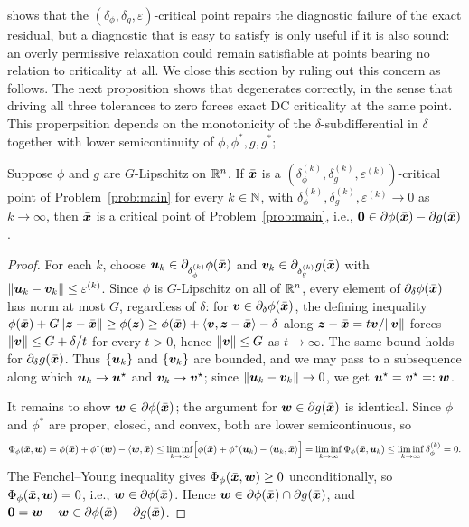  shows that the $(\delta_\phi,\delta_g,\varepsilon)$-critical point repairs the diagnostic failure of the exact residual, but a diagnostic that is easy to satisfy is only useful if it is also sound: an overly permissive relaxation could remain satisfiable at points bearing no relation to criticality at all. We close this section by ruling out this concern as follows.
 The next proposition shows that  degenerates correctly, in the sense that driving all three tolerances to zero forces exact DC criticality at the same point.
This properpsition depends on the monotonicity of the $\delta$-subdifferential in $\delta$ together with lower semicontinuity of $\phi,\phi^*,g,g^*$; 

\begin{proposition}
\label{prop:exact-consistency}
Suppose $\phi$ and $g$ are $G$-Lipschitz on $\mathbb{R}^n$. If $\bar{\bm{x}}$ is a $(\delta_\phi^{(k)},\delta_g^{(k)},\varepsilon^{(k)})$-critical point of Problem~\eqref{prob:main} for every $k\in\mathbb{N}$, with $\delta_\phi^{(k)},\delta_g^{(k)},\varepsilon^{(k)}\to0$ as $k\to\infty$, then $\bar{\bm{x}}$ is a critical point of Problem~\eqref{prob:main}, i.e., $\bm{0}\in\partial\phi(\bar{\bm{x}})-\partial g(\bar{\bm{x}})$.
\end{proposition}

\begin{proof}
For each $k$, choose $\bm{u}_k\in\partial_{\delta_\phi^{(k)}}\phi(\bar{\bm{x}})$ and $\bm{v}_k\in\partial_{\delta_g^{(k)}}g(\bar{\bm{x}})$ with $\|\bm{u}_k-\bm{v}_k\|\le\varepsilon^{(k)}$. Since $\phi$ is $G$-Lipschitz on all of $\mathbb{R}^n$, every element of $\partial_\delta\phi(\bar{\bm{x}})$ has norm at most $G$, regardless of $\delta$: for $\bm{v}\in\partial_\delta\phi(\bar{\bm{x}})$, the defining inequality $\phi(\bar{\bm{x}})+G\|\bm{z}-\bar{\bm{x}}\|\ge\phi(\bm{z})\ge\phi(\bar{\bm{x}})+\langle\bm{v},\bm{z}-\bar{\bm{x}}\rangle-\delta$ along $\bm{z}-\bar{\bm{x}}=t\bm{v}/\|\bm{v}\|$ forces $\|\bm{v}\|\le G+\delta/t$ for every $t>0$, hence $\|\bm{v}\|\le G$ as $t\to\infty$. The same bound holds for $\partial_\delta g(\bar{\bm{x}})$. Thus $\{\bm{u}_k\}$ and $\{\bm{v}_k\}$ are bounded, and we may pass to a subsequence along which $\bm{u}_k\to\bm{u}^\star$ and $\bm{v}_k\to\bm{v}^\star$; since $\|\bm{u}_k-\bm{v}_k\|\to0$, we get $\bm{u}^\star=\bm{v}^\star=:\bm{w}$.

It remains to show $\bm{w}\in\partial\phi(\bar{\bm{x}})$; the argument for $\bm{w}\in\partial g(\bar{\bm{x}})$ is identical. Since $\phi$ and $\phi^*$ are proper, closed, and convex, both are lower semicontinuous, so
\[
    \Phi_\phi(\bar{\bm{x}},\bm{w})
    =\phi(\bar{\bm{x}})+\phi^*(\bm{w})-\langle\bm{w},\bar{\bm{x}}\rangle
    \le\liminf_{k\to\infty}\Bigl[\phi(\bar{\bm{x}})+\phi^*(\bm{u}_k)-\langle\bm{u}_k,\bar{\bm{x}}\rangle\Bigr]
    =\liminf_{k\to\infty}\Phi_\phi(\bar{\bm{x}},\bm{u}_k)
    \le\liminf_{k\to\infty}\delta_\phi^{(k)}=0.
\]
The Fenchel--Young inequality gives $\Phi_\phi(\bar{\bm{x}},\bm{w})\ge0$ unconditionally, so $\Phi_\phi(\bar{\bm{x}},\bm{w})=0$, i.e., $\bm{w}\in\partial\phi(\bar{\bm{x}})$. Hence $\bm{w}\in\partial\phi(\bar{\bm{x}})\cap\partial g(\bar{\bm{x}})$, and $\bm{0}=\bm{w}-\bm{w}\in\partial\phi(\bar{\bm{x}})-\partial g(\bar{\bm{x}})$.
\end{proof}


